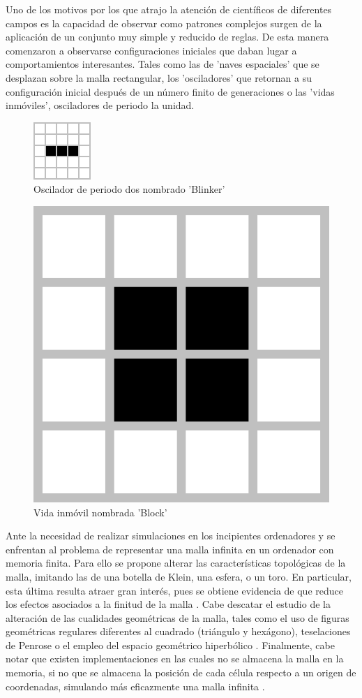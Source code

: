 \documentclass[../proyecto.tex]{book}
\begin{document}
Uno de los motivos por los que atrajo la atención de científicos de diferentes campos es la capacidad de observar como patrones complejos surgen de la aplicación de un conjunto muy simple y reducido de reglas. De esta manera comenzaron a observarse configuraciones iniciales que daban lugar a comportamientos interesantes. Tales como las de 'naves espaciales' que se desplazan sobre la malla rectangular, los 'osciladores' que retornan a su configuración inicial después de un número finito de generaciones o las 'vidas inmóviles', osciladores de periodo la unidad.

\begin{figure}[H]
	\centering
	\includegraphics[height=.15\linewidth]{./images/blinker.png}
	\caption{Oscilador de periodo dos nombrado 'Blinker'}
	\label{fig:blinker}
\end{figure} 
\begin{figure}[H]
	
	\centering
	\includegraphics[height=.15\linewidth]{./images/block.png}
	\caption{Vida inmóvil nombrada 'Block'}
	\label{fig:block}
\end{figure} 

Ante la necesidad de realizar simulaciones en los incipientes ordenadores y se enfrentan al problema de representar una malla infinita en un ordenador con memoria finita. Para ello se propone alterar las características topológicas de la malla, imitando las de una botella de Klein, una esfera, o un toro. En particular, esta última resulta atraer gran interés, pues se obtiene evidencia de que reduce los efectos asociados a la finitud de la malla \cite{finitudMalla, finitudMalla2}. Cabe descatar el estudio de la alteración de las cualidades geométricas de la malla, tales como el uso de figuras geométricas regulares diferentes al cuadrado (triángulo y hexágono)\cite{triangular}, teselaciones de Penrose \cite{penrose} o el empleo del espacio geométrico hiperbólico \cite{hiperbolico}. Finalmente, cabe notar que existen implementaciones en las cuales no se almacena la malla en la memoria, si no que se almacena la posición de cada célula respecto a un origen de coordenadas, simulando más eficazmente una malla infinita \cite{boardless}.
\end{document}
